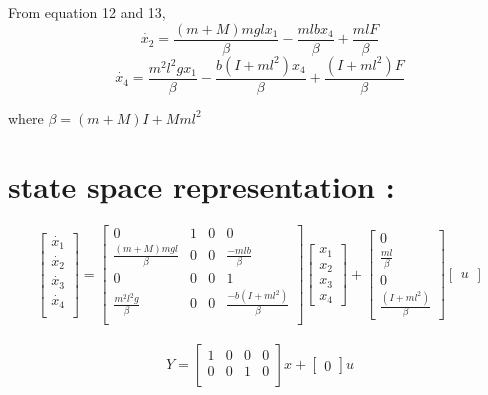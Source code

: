 \documentclass[11pt]{article}
\begin{document}
\begin{flushleft}
{From equation 12 and 13,}
\begin{equation}
    \dot{x_2}=\frac{(m+M)mglx_1}{\beta}-\frac{mlbx_4}{\beta}+\frac{mlF}{\beta}
\end{equation}
\begin{equation}
    \dot{x_4}=\frac{m^2l^2gx_1}{\beta}-\frac{b(I+ml^2)x_4}{\beta}+\frac{(I+ml^2)F}{\beta}
\end{equation}


{where $\beta=(m+M)I+Mml^2$}


\section{state space representation :}
$$\begin{bmatrix}
\dot{x_1}\\
\dot{x_2}\\
\dot{x_3}\\
\dot{x_4}\\
\end{bmatrix}=\begin{bmatrix}
0&1&0&0\\
\frac{(m+M)mgl}{\beta}&0&0&\frac{-mlb}{\beta}\\
0&0&0&1\\
\frac{m^2l^2g}{\beta}&0&0&\frac{-b(I+ml^2)}{\beta}\\
\end{bmatrix}
\begin{bmatrix}
x_1\\
x_2\\
x_3\\
x_4
\end{bmatrix}+
\begin{bmatrix}
0\\
\frac{ml}{\beta}\\
0\\
\frac{(I+ml^2)}{\beta}
\end{bmatrix}
\begin{bmatrix}
u
\end{bmatrix}
$$\\
$$
Y=\begin{bmatrix}
1&0&0&0\\
0&0&1&0\\
\end{bmatrix}x+\begin{bmatrix}
0
\end{bmatrix}u
$$
\end{flushleft}
\end{document}
